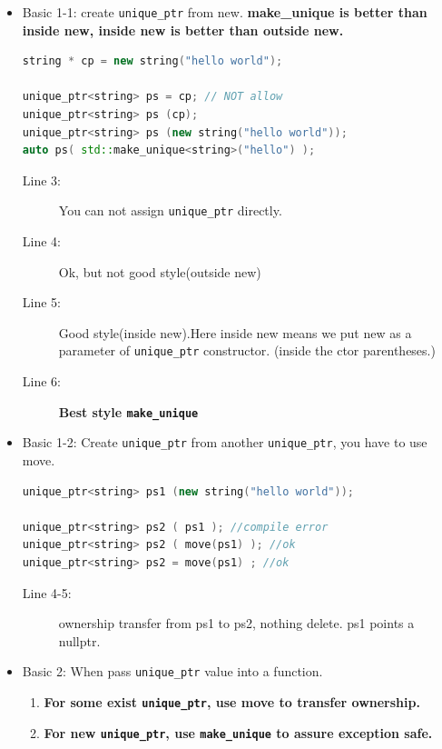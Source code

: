 \documentclass[a4paper,11pt,twoside]{book}
\begin{document}
\begin{itemize}

\item Basic 1-1: create \texttt{unique\_ptr} from new. \textbf{make\_unique is better than inside new, inside new is better than outside new.}
\begin{lstlisting}[frame=single, language=c++]
string * cp = new string("hello world");

unique_ptr<string> ps = cp; // NOT allow
unique_ptr<string> ps (cp);
unique_ptr<string> ps (new string("hello world"));
auto ps( std::make_unique<string>("hello") );
\end{lstlisting}
\begin{description}
	\item[Line 3:] You can not assign \texttt{unique\_ptr} directly.
	\item[Line 4:] Ok, but not good style(outside new)
	\item[Line 5:] Good style(inside new).Here inside new means we put new as a parameter of \texttt{unique\_ptr} constructor. (inside the ctor parentheses.)
	\item[Line 6:] \textbf{Best style \texttt{make\_unique} }
\end{description}

\item Basic 1-2: Create \texttt{unique\_ptr} from another \texttt{unique\_ptr}, you have to use move.
\begin{lstlisting}[frame=single, language=c++]
unique_ptr<string> ps1 (new string("hello world"));

unique_ptr<string> ps2 ( ps1 ); //compile error
unique_ptr<string> ps2 ( move(ps1) ); //ok
unique_ptr<string> ps2 = move(ps1) ; //ok
\end{lstlisting}
\begin{description}
	\item[Line 4-5:] ownership transfer from ps1 to ps2, nothing delete. ps1 points a nullptr.
\end{description}

\item Basic 2: When pass \texttt{unique\_ptr} value into a function.
\begin{enumerate}
	\item \textbf{For some exist \texttt{unique\_ptr}, use move to transfer ownership.}
	\item \textbf{For new \texttt{unique\_ptr}, use \texttt{make\_unique} to assure exception safe.}	
\end{enumerate}



\end{itemize}
\end{document}

